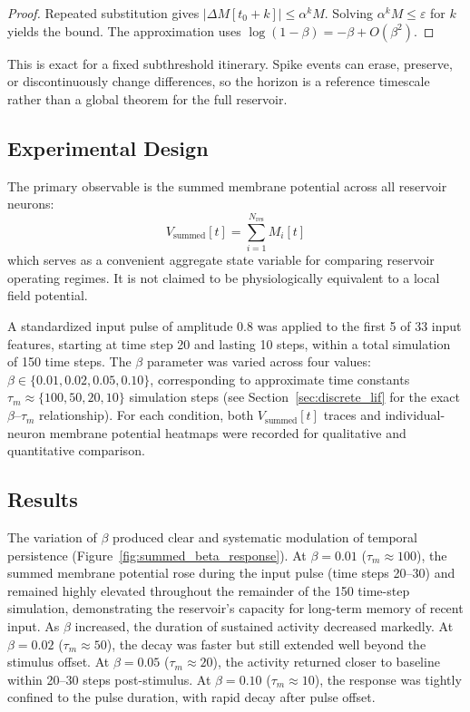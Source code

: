 \begin{proof}
Repeated substitution gives $|\Delta M[t_0+k]|\le\alpha^kM$. Solving
$\alpha^kM\le\varepsilon$ for $k$ yields the bound. The approximation uses
$\log(1-\beta)=-\beta+O(\beta^2)$.
\end{proof}

This is exact for a fixed subthreshold itinerary. Spike events can erase,
preserve, or discontinuously change differences, so the horizon is a reference
timescale rather than a global theorem for the full reservoir.

\subsection{Experimental Design}

The primary observable is the summed membrane potential across all reservoir neurons:
\begin{equation}
    V_{\text{summed}}[t] = \sum_{i=1}^{N_{\text{res}}} M_i[t]
    \label{eq:v_summed}
\end{equation}
which serves as a convenient aggregate state variable for comparing reservoir operating regimes. It is not claimed to be physiologically equivalent to a local field potential.

A standardized input pulse of amplitude 0.8 was applied to the first 5 of 33 input features, starting at time step 20 and lasting 10 steps, within a total simulation of 150 time steps. The $\beta$ parameter was varied across four values: $\beta \in \{0.01, 0.02, 0.05, 0.10\}$, corresponding to approximate time constants $\tau_m \approx \{100, 50, 20, 10\}$ simulation steps (see Section~\ref{sec:discrete_lif} for the exact $\beta$--$\tau_m$ relationship). For each condition, both $V_{\text{summed}}[t]$ traces and individual-neuron membrane potential heatmaps were recorded for qualitative and quantitative comparison.

\subsection{Results}

The variation of $\beta$ produced clear and systematic modulation of temporal persistence (Figure~\ref{fig:summed_beta_response}). At $\beta = 0.01$ ($\tau_m \approx 100$), the summed membrane potential rose during the input pulse (time steps 20--30) and remained highly elevated throughout the remainder of the 150 time-step simulation, demonstrating the reservoir's capacity for long-term memory of recent input. As $\beta$ increased, the duration of sustained activity decreased markedly. At $\beta = 0.02$ ($\tau_m \approx 50$), the decay was faster but still extended well beyond the stimulus offset. At $\beta = 0.05$ ($\tau_m \approx 20$), the activity returned closer to baseline within 20--30 steps post-stimulus. At $\beta = 0.10$ ($\tau_m \approx 10$), the response was tightly confined to the pulse duration, with rapid decay after pulse offset.

